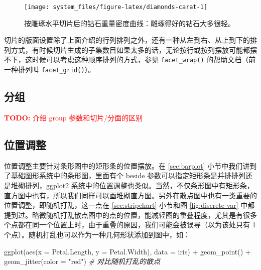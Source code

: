 \documentclass[
  b5paper,
  UTF8,twoside]{book}
\newenvironment{Shaded}{\begin{snugshade}}{\end{snugshade}}
\newcommand{\AttributeTok}[1]{\textcolor[rgb]{0.77,0.63,0.00}{#1}}
\newcommand{\CommentTok}[1]{\textcolor[rgb]{0.56,0.35,0.01}{\textit{#1}}}
\newcommand{\FunctionTok}[1]{\textcolor[rgb]{0.00,0.00,0.00}{#1}}
\newcommand{\NormalTok}[1]{#1}
\newcommand{\SpecialCharTok}[1]{\textcolor[rgb]{0.00,0.00,0.00}{#1}}
\newcommand{\StringTok}[1]{\textcolor[rgb]{0.31,0.60,0.02}{#1}}
\begin{document}
\begin{figure}

{\centering \texttt{[image: system\_files/figure-latex/diamonds-carat-1]} 

}

\caption[按雕琢水平切片后的钻石重量密度曲线]{按雕琢水平切片后的钻石重量密度曲线：雕琢得好的钻石大多很轻。}\label{fig:diamonds-carat}
\end{figure}





切片的版面设置除了上面介绍的行列排列之外，还有一种从左到右、从上到下的排列方式，有时候切片生成的子集数目如果太多的话，无论按行或按列摆放可能都摆不下，这时候可以考虑这种顺序排列的方式，参见 \texttt{facet\_wrap()} 的帮助文档（前一种排列叫 \texttt{facet\_grid()}）。

\hypertarget{subsec:group}{%
\subsection{分组}\label{subsec:group}}

\textcolor{red}{\textbf{TODO: }{介绍 group 参数和切片/分面的区别}}

\hypertarget{ux4f4dux7f6eux8c03ux6574}{%
\subsection{位置调整}\label{ux4f4dux7f6eux8c03ux6574}}

位置调整主要针对条形图中的矩形条的位置摆放。在 \ref{sec:barplot} 小节中我们讲到了基础图形系统中的条形图，里面有个 beside 参数可以指定矩形条是并排排列还是堆砌排列，ggplot2 系统中的位置调整也类似。当然，不仅条形图中有矩形条，直方图中也有，所以我们同样可以画堆砌直方图。另外在散点图中也有一类重要的位置调整，即随机打乱，这一点在 \ref{sec:stripchart} 小节和图 \ref{fig:discrete-var} 中都提到过。略微随机打乱散点图中的点的位置，能减轻图的重叠程度，尤其是有很多个点都在同一个位置上时，由于重叠的原因，我们可能会被误导（以为该处只有 1 个点）。随机打乱也可以作为一种几何形状添加到图中，如：

\begin{Shaded}
\begin{Highlighting}[]
\FunctionTok{ggplot}\NormalTok{(}\FunctionTok{aes}\NormalTok{(}\AttributeTok{x =}\NormalTok{ Petal.Length, }\AttributeTok{y =}\NormalTok{ Petal.Width), }\AttributeTok{data =}\NormalTok{ iris) }\SpecialCharTok{+}
  \FunctionTok{geom\_point}\NormalTok{() }\SpecialCharTok{+}
  \FunctionTok{geom\_jitter}\NormalTok{(}\AttributeTok{color =} \StringTok{"red"}\NormalTok{) }\CommentTok{\# 对比随机打乱的散点}
\end{Highlighting}
\end{Shaded}
\end{document}
